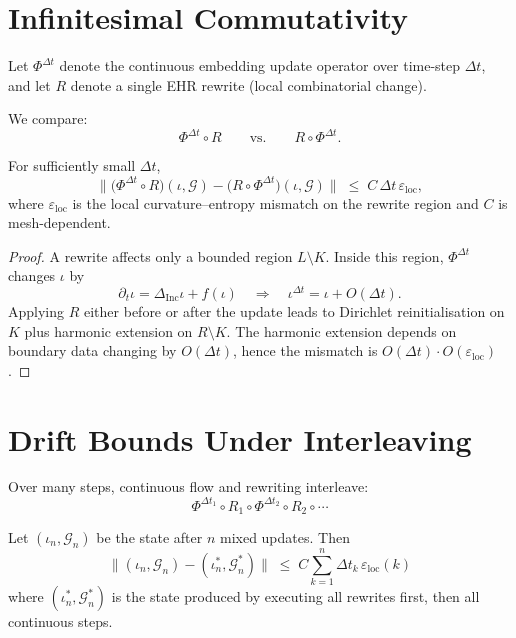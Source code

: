 \section{Infinitesimal Commutativity}

Let $\Phi^{\Delta t}$ denote the continuous embedding update operator
over time-step $\Delta t$,  
and let $R$ denote a single EHR rewrite (local combinatorial change).

We compare:
\[
  \Phi^{\Delta t} \circ R
  \qquad\text{vs.}\qquad
  R \circ \Phi^{\Delta t}.
\]

\begin{theorem}
\label{thm:infinitesimal-commute}
For sufficiently small $\Delta t$,
\[
   \bigl\|
      \bigl(\Phi^{\Delta t} \circ R\bigr)(\iota,\mathcal{G})
      -
      \bigl(R \circ \Phi^{\Delta t}\bigr)(\iota,\mathcal{G})
   \bigr\|
   \;\le\;
   C\,\Delta t\,\varepsilon_{\mathrm{loc}},
\]
where $\varepsilon_{\mathrm{loc}}$ is the local curvature–entropy mismatch  
on the rewrite region and $C$ is mesh-dependent.
\end{theorem}

\begin{proof}
A rewrite affects only a bounded region $L\setminus K$.  
Inside this region, $\Phi^{\Delta t}$ changes $\iota$ by
\[
 \partial_t \iota = \Delta_{\mathrm{Inc}} \iota + f(\iota)
\quad\Rightarrow\quad
 \iota^{\Delta t} = \iota + O(\Delta t).
\]
Applying $R$ either before or after the update leads to  
Dirichlet reinitialisation on $K$ plus harmonic extension on $R\setminus K$.  
The harmonic extension depends on boundary data  
changing by $O(\Delta t)$,  
hence the mismatch is $O(\Delta t)\cdot O(\varepsilon_{\mathrm{loc}})$.  
\end{proof}

\section{Drift Bounds Under Interleaving}

Over many steps, continuous flow and rewriting interleave:
\[
  \Phi^{\Delta t_1} \circ R_1 \circ
  \Phi^{\Delta t_2} \circ R_2 \circ
  \cdots
\]

\begin{theorem}
\label{thm:drift-bound}
Let $(\iota_n,\mathcal{G}_n)$ be the state after $n$ mixed updates.  
Then
\[
  \bigl\|(\iota_n,\mathcal{G}_n)
        - (\iota^{\ast}_n,\mathcal{G}^{\ast}_n)\bigr\|
     \;\le\;
     C \sum_{k=1}^n \Delta t_k \,\varepsilon_{\mathrm{loc}}(k)
\]
where $(\iota^{\ast}_n,\mathcal{G}^{\ast}_n)$ is the state produced by executing  
all rewrites first, then all continuous steps.
\end{theorem}

